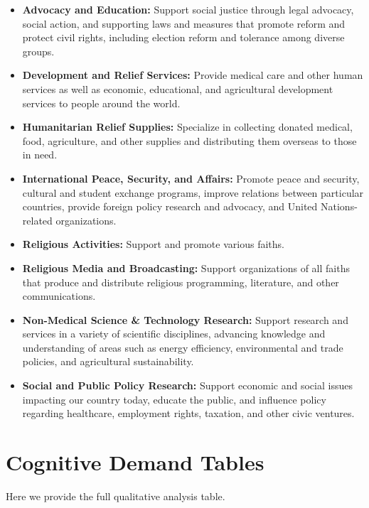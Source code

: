 \begin{itemize}
    \item \textbf{Advocacy and Education:} Support social justice through legal advocacy, social action, and supporting laws and measures that promote reform and protect civil rights, including election reform and tolerance among diverse groups.
    \item \textbf{Development and Relief Services:} Provide medical care and other human services as well as economic, educational, and agricultural development services to people around the world.
    \item \textbf{Humanitarian Relief Supplies:} Specialize in collecting donated medical, food, agriculture, and other supplies and distributing them overseas to those in need.
    \item \textbf{International Peace, Security, and Affairs:} Promote peace and security, cultural and student exchange programs, improve relations between particular countries, provide foreign policy research and advocacy, and United Nations-related organizations.
    \item \textbf{Religious Activities:} Support and promote various faiths.
    \item \textbf{Religious Media and Broadcasting:} Support organizations of all faiths that produce and distribute religious programming, literature, and other communications.
    \item \textbf{Non-Medical Science \& Technology Research:} Support research and services in a variety of scientific disciplines, advancing knowledge and understanding of areas such as energy efficiency, environmental and trade policies, and agricultural sustainability.
    \item \textbf{Social and Public Policy Research:} Support economic and social issues impacting our country today, educate the public, and influence policy regarding healthcare, employment rights, taxation, and other civic ventures.
\end{itemize}

\section{Cognitive Demand Tables}
Here we provide the full qualitative analysis table.

